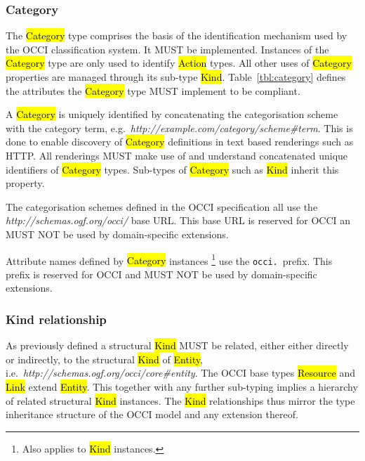 \documentclass[10pt,a4paper,british]{article}
\begin{document}
\subsubsection{Category}
\label{sec:category}
The \hl{Category} type comprises the basis of the identification mechanism used
by the OCCI classification system. It MUST be implemented. Instances of the
\hl{Category} type are only used to identify \hl{Action} types. All other uses
of \hl{Category} properties are managed through its sub-type \hl{Kind}.
%
Table~\ref{tbl:category} defines the attributes the \hl{Category} type MUST
implement to be compliant.


A \hl{Category} is uniquely identified by concatenating the categorisation
scheme with the category term,
e.g.~\textit{http://example.com/category/scheme\#term}.
This is done to enable discovery of \hl{Category} definitions in text based
renderings such as HTTP. All renderings MUST make use of and understand
concatenated unique identifiers of \hl{Category} types.
%
Sub-types of \hl{Category} such as \hl{Kind} inherit this property.

The categorisation schemes defined in the OCCI specification all use the
\textit{http://schemas.ogf.org/occi/} base URL. This base URL is reserved for
OCCI an MUST NOT be used by domain-specific extensions.

Attribute names defined by \hl{Category} instances%
\footnote{Also applies to \hl{Kind} instances.}
use the \texttt{occi.}~prefix.  This prefix is reserved for OCCI and MUST NOT
be used by domain-specific extensions.

\subsubsection{Kind relationship}
\label{sec:type_relationship}
As previously defined a structural \hl{Kind} MUST be related, either
either directly or indirectly, to the structural \hl{Kind} of \hl{Entity},
i.e.~\textit{http://schemas.ogf.org/occi/core\#entity}.
%
The OCCI base types \hl{Resource} and \hl{Link} extend \hl{Entity}.  This
together with any further sub-typing implies a hierarchy of related structural
\hl{Kind} instances.  The \hl{Kind} relationships thus mirror the type
inheritance structure of the OCCI model and any extension thereof.
\end{document}
